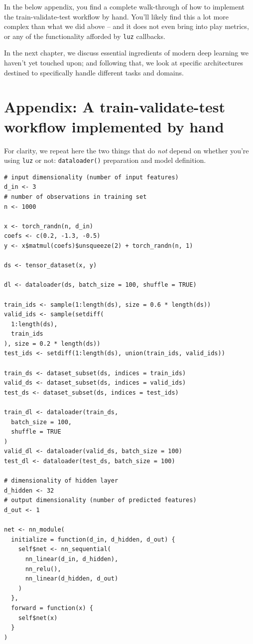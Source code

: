 \documentclass[
  letterpaper,
]{krantz}
\begin{document}
In the below appendix, you find a complete walk-through of how to
implement the train-validate-test workflow by hand. You'll likely find
this a lot more complex than what we did above -- and it does not even
bring into play metrics, or any of the functionality afforded by
\texttt{luz} callbacks.

In the next chapter, we discuss essential ingredients of modern deep
learning we haven't yet touched upon; and following that, we look at
specific architectures destined to specifically handle different tasks
and domains.

\hypertarget{appendix-a-train-validate-test-workflow-implemented-by-hand}{%
\section{Appendix: A train-validate-test workflow implemented by
hand}\label{appendix-a-train-validate-test-workflow-implemented-by-hand}}

For clarity, we repeat here the two things that do \emph{not} depend on
whether you're using \texttt{luz} or not: \texttt{dataloader()}
preparation and model definition.

\begin{verbatim}
# input dimensionality (number of input features)
d_in <- 3
# number of observations in training set
n <- 1000

x <- torch_randn(n, d_in)
coefs <- c(0.2, -1.3, -0.5)
y <- x$matmul(coefs)$unsqueeze(2) + torch_randn(n, 1)

ds <- tensor_dataset(x, y)

dl <- dataloader(ds, batch_size = 100, shuffle = TRUE)

train_ids <- sample(1:length(ds), size = 0.6 * length(ds))
valid_ids <- sample(setdiff(
  1:length(ds),
  train_ids
), size = 0.2 * length(ds))
test_ids <- setdiff(1:length(ds), union(train_ids, valid_ids))

train_ds <- dataset_subset(ds, indices = train_ids)
valid_ds <- dataset_subset(ds, indices = valid_ids)
test_ds <- dataset_subset(ds, indices = test_ids)

train_dl <- dataloader(train_ds,
  batch_size = 100,
  shuffle = TRUE
)
valid_dl <- dataloader(valid_ds, batch_size = 100)
test_dl <- dataloader(test_ds, batch_size = 100)

# dimensionality of hidden layer
d_hidden <- 32
# output dimensionality (number of predicted features)
d_out <- 1

net <- nn_module(
  initialize = function(d_in, d_hidden, d_out) {
    self$net <- nn_sequential(
      nn_linear(d_in, d_hidden),
      nn_relu(),
      nn_linear(d_hidden, d_out)
    )
  },
  forward = function(x) {
    self$net(x)
  }
)
\end{verbatim}
\end{document}
